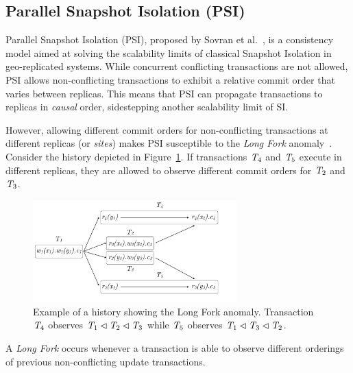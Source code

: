 \subsection{Parallel Snapshot Isolation (PSI)}
\label{sect:psi}

Parallel Snapshot Isolation (PSI), proposed by Sovran et al.~\citep{psi-intro}, is a consistency model aimed at solving the scalability limits of classical Snapshot Isolation in geo-replicated systems. While concurrent conflicting transactions are not allowed, PSI allows non-conflicting transactions to exhibit a relative commit order that varies between replicas. This means that PSI can propagate transactions to replicas in \emph{causal} order, sidestepping another scalability limit of SI.

However, allowing different commit orders for non-conflicting transactions at different replicas (or \emph{sites}) makes PSI susceptible to the \emph{Long Fork} anomaly~\citep{psi-intro}. Consider the history depicted in Figure~\ref{fig:long_fork_history}. If transactions $\mathit{T}_4$ and $\mathit{T}_5$ execute in different replicas, they are allowed to observe different commit orders for $\mathit{T}_2$ and $\mathit{T}_3$.

\begin{figure}[h]
  \centering
  \includegraphics[width=0.7\textwidth]{figures/long_fork_hist.pdf}
  \caption{Example of a history showing the Long Fork anomaly. Transaction $\mathit{T}_4$ observes $\mathit{T}_1 \lhd \mathit{T}_2 \lhd \mathit{T}_3$ while $\mathit{T}_5$ observes $\mathit{T}_1 \lhd \mathit{T}_3 \lhd \mathit{T}_2$.}
  \label{fig:long_fork_history}
\end{figure}

\begin{definition}
A \emph{Long Fork} occurs whenever a transaction is able to observe different orderings of previous non-conflicting update transactions.
\end{definition}

